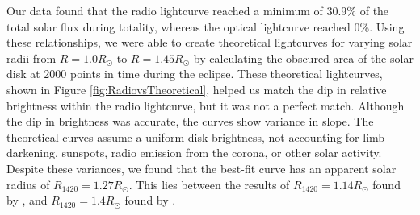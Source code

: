 Our data found that the radio lightcurve reached a minimum of 30.9\% of the total solar flux during totality, whereas the optical lightcurve reached 0\%.
Using these relationships, we were able to create theoretical lightcurves for varying solar radii from $R = 1.0 R_{\odot}$ to $R = 1.45 R_{\odot}$ by calculating the obscured area of the solar disk at 2000 points in time during the eclipse.
These theoretical lightcurves, shown in Figure \ref{fig:RadiovsTheoretical}, helped us match the dip in relative brightness within the radio lightcurve, but it was not a perfect match.
Although the dip in brightness was accurate, the curves show variance in slope.
The theoretical curves assume a uniform disk brightness, not accounting for limb darkening, sunspots, radio emission from the corona, or other solar activity.
Despite these variances, we found that the best-fit curve has an apparent solar radius of $R_{\mathrm{1420}} = 1.27 R_{\odot}$.
This lies between the results of $R_{\mathrm{1420}} = 1.14 R_{\odot}$ found by \cite{messerotti_radio_2000}, and $R_{\mathrm{1420}} = 1.4 R_{\odot}$ found by \cite{leung_solar_2022}.
